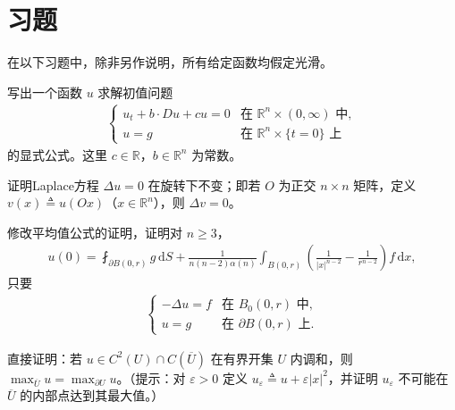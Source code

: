 \documentclass[../../main.tex]{subfiles}
\begin{document}
\section{习题}\label{section:ch02-exercises}

在以下习题中，除非另作说明，所有给定函数均假定光滑。

\begin{exercise}\label{exercise:ch02-1}
写出一个函数 $u$ 求解初值问题
\begin{align*}
\begin{cases}
u_t+b\cdot Du+cu=0 & \text{在 }\mathbb{R}^n\times(0,\infty)\text{ 中},\\
u=g & \text{在 }\mathbb{R}^n\times\{t=0\}\text{ 上}
\end{cases}
\end{align*}
的显式公式。这里 $c\in\mathbb{R}$，$b\in\mathbb{R}^n$ 为常数。
\end{exercise}

\begin{exercise}\label{exercise:ch02-2}
证明Laplace方程 $\Delta u=0$ 在旋转下不变；即若 $O$ 为正交 $n\times n$ 矩阵，定义 $v(x)\triangleq u(Ox)$（$x\in\mathbb{R}^n$），则 $\Delta v=0$。
\end{exercise}

\begin{exercise}\label{exercise:ch02-3}
修改平均值公式的证明，证明对 $n\geqslant 3$，
\begin{align*}
u(0)=\fint_{\partial B(0,r)}g\,\mathrm{d}S+\frac{1}{n(n-2)\alpha(n)}\int_{B(0,r)}\left(\frac{1}{|x|^{n-2}}-\frac{1}{r^{n-2}}\right)f\,\mathrm{d}x,
\end{align*}
只要
\begin{align*}
\begin{cases}
-\Delta u=f & \text{在 }B_0(0,r)\text{ 中},\\
u=g & \text{在 }\partial B(0,r)\text{ 上}.
\end{cases}
\end{align*}
\end{exercise}

\begin{exercise}\label{exercise:ch02-4}
直接证明：若 $u\in C^2(U)\cap C(\overline{U})$ 在有界开集 $U$ 内调和，则 $\max_{\overline{U}}u=\max_{\partial U}u$。（提示：对 $\varepsilon>0$ 定义 $u_\varepsilon\triangleq u+\varepsilon|x|^2$，并证明 $u_\varepsilon$ 不可能在 $\overline{U}$ 的内部点达到其最大值。）
\end{exercise}
\end{document}
